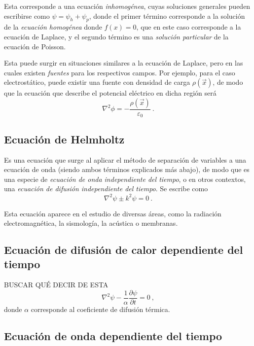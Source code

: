 Esta corresponde a una ecuación \emph{inhomogénea}, cuyas soluciones generales pueden escribirse como $\psi = \psi_h + \psi_p$, donde el primer término corresponde a la solución de la \emph{ecuación homogénea} donde $f(x) = 0$, que en este caso corresponde a la ecuación de Laplace, y el segundo término es una \emph{solución particular} de la ecuación de Poisson.

Esta puede surgir en situaciones similares a la ecuación de Laplace, pero en las cuales existen \emph{fuentes} para los respectivos campos. Por ejemplo, para el caso electrostático, puede existir una fuente con densidad de carga $\rho(\vec{x})$, de modo que la ecuación que describe el potencial eléctrico en dicha región será
\begin{equation}
    \nabla^2 \phi = - \frac{\rho(\vec{x})}{\varepsilon_0} \ .
\end{equation}

\subsection{Ecuación de Helmholtz}

Es una ecuación que surge al aplicar el método de separación de variables a una ecuación de onda (siendo ambos términos explicados más abajo), de modo que es una especie de \emph{ecuación de onda independiente del tiempo}, o en otros contextos, una \emph{ecuación de difusión independiente del tiempo}. Se escribe como
\begin{equation}
    \nabla^2 \psi \pm k^2 \psi = 0 \ .
\end{equation}

Esta ecuación aparece en el estudio de diversas áreas, como la radiación electromagnética, la sismología, la acústica o membranas.



\subsection{Ecuación de difusión de calor dependiente del tiempo}

BUSCAR QUÉ DECIR DE ESTA 
\begin{equation}
    \nabla^2 \psi - \frac{1}{\alpha} \frac{\partial \psi}{\partial t} = 0 \ ,
\end{equation}
donde $\alpha$ corresponde al coeficiente de difusión térmica.

\subsection{Ecuación de onda dependiente del tiempo}


